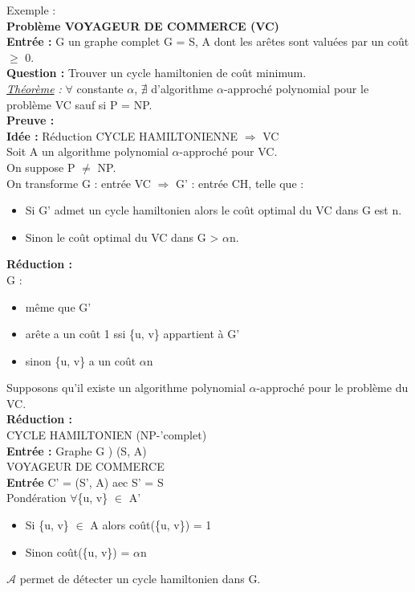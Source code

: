 \documentclass[12pt,a4paper]{article}
\newcommand\tab[1][0.65cm]{\hspace*{#1}}
\begin{document}
Exemple :\\
\textbf{\Large Problème VOYAGEUR DE COMMERCE (VC)}\\
\tab \textbf{Entrée :} G un graphe complet G = {S, A} dont les arêtes sont valuées par un coût $\geq$ 0.\\
\tab \textbf{Question :} Trouver un cycle hamiltonien de coût minimum.\\
\textit{\underline{Théorème} :} $\forall$ constante $\alpha$, $\nexists$ d'algorithme $\alpha$-approché polynomial pour le problème VC sauf si P = NP.\\
\textbf{Preuve :}\\
\textbf{Idée :} Réduction CYCLE HAMILTONIENNE $\Rightarrow$ VC\\
Soit A un algorithme polynomial $\alpha$-approché pour VC.\\
On suppose P $\neq$ NP.\\
On transforme G : entrée VC $\Rightarrow$ G' : entrée CH, telle que :
\begin{itemize}
	\item Si G' admet un cycle hamiltonien alors le coût optimal du VC dans G est n.
	\item Sinon le coût optimal du VC dans G > $\alpha$n.
\end{itemize}
\textbf{Réduction :}\\
G :
\begin{itemize}
	\item même que G'
	\item arête a un coût 1 ssi \{u, v\} appartient à G'
	\item sinon \{u, v\} a un coût $\alpha$n
\end{itemize}
Supposons qu'il existe un algorithme polynomial $\alpha$-approché pour le problème du VC.\\
\textbf{Réduction :}\\
CYCLE HAMILTONIEN (NP-'complet)\\
\tab \textbf{Entrée :} Graphe G ) (S, A)\\
VOYAGEUR DE COMMERCE\\
\tab \textbf{Entrée} C' = (S', A) aec S' = S\\
Pondération $\forall$\{u, v\} $\in$ A'
\begin{itemize}
	\item Si \{u, v\} $\in$ A alors coût(\{u, v\}) = 1
	\item Sinon coût(\{u, v\}) = $\alpha$n
\end{itemize}
$\mathcal{A}$ permet de détecter un cycle hamiltonien dans G.
\end{document}
